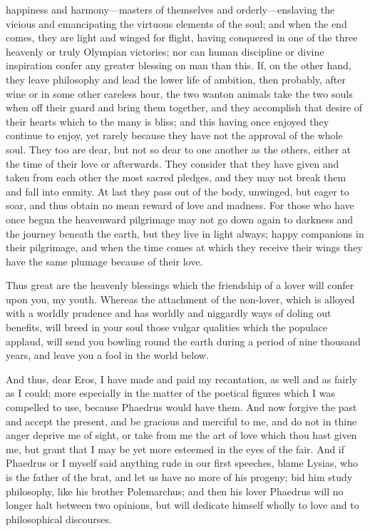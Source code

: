 \documentclass[11pt,letter]{article}
\begin{document}
happiness and harmony—masters of themselves and orderly—enslaving the vicious and emancipating the virtuous elements of the soul; and when the end comes, they are light and winged for flight, having conquered in one of the three heavenly or truly Olympian victories; nor can human discipline or divine inspiration confer any greater blessing on man than this. If, on the other hand, they leave philosophy and lead the lower life of ambition, then probably, after wine or in some other careless hour, the two wanton animals take the two souls when off their guard and bring them together, and they accomplish that desire of their hearts which to the many is bliss; and this having once enjoyed they continue to enjoy, yet rarely because they have not the approval of the whole soul. They too are dear, but not so dear to one another as the others, either at the time of their love or afterwards. They consider that they have given and taken from each other the most sacred pledges, and they may not break them and fall into enmity. At last they pass out of the body, unwinged, but eager to soar, and thus obtain no mean reward of love and madness. For those who have once begun the heavenward pilgrimage may not go down again to darkness and the journey beneath the earth, but they live in light always; happy companions in their pilgrimage, and when the time comes at which they receive their wings they have the same plumage because of their love.

\par  Thus great are the heavenly blessings which the friendship of a lover will confer upon you, my youth. Whereas the attachment of the non-lover, which is alloyed with a worldly prudence and has worldly and niggardly ways of doling out benefits, will breed in your soul those vulgar qualities which the populace applaud, will send you bowling round the earth during a period of nine thousand years, and leave you a fool in the world below.

\par  And thus, dear Eros, I have made and paid my recantation, as well and as fairly as I could; more especially in the matter of the poetical figures which I was compelled to use, because Phaedrus would have them. And now forgive the past and accept the present, and be gracious and merciful to me, and do not in thine anger deprive me of sight, or take from me the art of love which thou hast given me, but grant that I may be yet more esteemed in the eyes of the fair. And if Phaedrus or I myself said anything rude in our first speeches, blame Lysias, who is the father of the brat, and let us have no more of his progeny; bid him study philosophy, like his brother Polemarchus; and then his lover Phaedrus will no longer halt between two opinions, but will dedicate himself wholly to love and to philosophical discourses.
\end{document}
